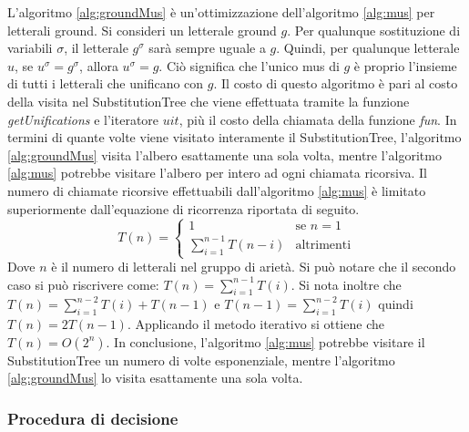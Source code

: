 \documentclass[./main.tex]{subfiles}
\begin{document}
L'algoritmo \ref{alg:groundMus} è un'ottimizzazione dell'algoritmo \ref{alg:mus} per letterali ground.
Si consideri un letterale ground $g$. Per qualunque sostituzione di variabili $\sigma$, 
il letterale $g^\sigma$ sarà sempre uguale a $g$. Quindi, per qualunque letterale $u$, se $u^\sigma = g^\sigma$, allora $u^\sigma = g$.
Ciò significa che l'unico mus di $g$ è proprio l'insieme di tutti i letterali che unificano con $g$.
Il costo di questo algoritmo è pari al costo della visita nel SubstitutionTree che viene effettuata tramite la funzione \textit{getUnifications}
e l'iteratore $uit$,
più il costo della chiamata della funzione \textit{fun}.
In termini di quante volte viene visitato interamente il SubstitutionTree, l'algoritmo \ref{alg:groundMus} visita l'albero
esattamente una sola volta, mentre l'algoritmo \ref{alg:mus} potrebbe visitare l'albero per intero ad ogni chiamata ricorsiva.
Il numero di chiamate ricorsive effettuabili dall'algoritmo \ref{alg:mus} è limitato superiormente dall'equazione di ricorrenza riportata di seguito.
$$
T(n) = 
\begin{cases}
    1 & \text{se } n = 1\\
    \sum\limits_{i=1}^{n-1} T(n-i) & \text{altrimenti}
\end{cases}
$$
Dove $n$ è il numero di letterali nel gruppo di arietà.
Si può notare che il secondo caso si può riscrivere come: $T(n) = \sum\limits_{i=1}^{n-1} T(i)$. Si nota inoltre che
$T(n) = \sum\limits_{i=1}^{n-2} T(i) + T(n-1)$ e $T(n-1) = \sum\limits_{i=1}^{n-2} T(i)$ quindi $T(n) = 2T(n-1)$.
Applicando il metodo iterativo si ottiene che $T(n) = O(2^n)$.
In conclusione, l'algoritmo \ref{alg:mus} potrebbe visitare il SubstitutionTree un numero di volte esponenziale, 
mentre l'algoritmo \ref{alg:groundMus} lo visita esattamente una sola volta.



\subsubsection{Procedura di decisione}
\end{document}
